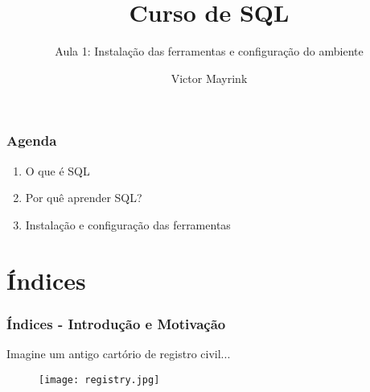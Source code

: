 \documentclass[t, 10pt, aspectratio=169, table, x11names]{beamer}
\begin{document}
	\author{Victor Mayrink}
	\title{Curso de SQL}
	\subtitle{Aula 1: Instalação das ferramentas e configuração do ambiente}

	\begin{frame}[plain]
		\maketitle
	\end{frame}

	\begin{frame}
		\frametitle{Agenda}
		\vspace{1cm}
		\begin{enumerate}
			\large
			\item O que é SQL
			\item Por quê aprender SQL?
			\item Instalação e configuração das ferramentas
		\end{enumerate}
	\end{frame}
	

	\section{Índices}

	\begin{frame}
		\frametitle{Índices - Introdução e Motivação}
		Imagine um antigo cartório de registro civil...
		\bigskip
		\begin{figure}[h]
			\centering
			\texttt{[image: registry.jpg]}
		\end{figure}
	\end{frame}
\end{document}
